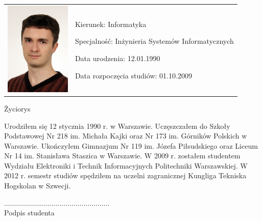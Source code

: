 \documentclass[../thesis.tex]{subfiles}
\begin{document}
\begin{flushleft}
\fontsize{12pt}{30pt}\selectfont

\vspace*{6mm}

\begin{tabular}{l l}
  \begin{minipage}{4cm}
    \includegraphics[height=4.5cm]{face.jpg}
  \end{minipage}
  &
  \begin{minipage}{15cm}
    Kierunek: \hspace{15mm} Informatyka

    Specjalność: \hspace{10mm} Inżynieria Systemów Informatycznych

    Data urodzenia: \hspace{51mm} 12.01.1990

    Data rozpoczęcia studiów: \hspace{33mm} 01.10.2009
  \end{minipage}
\end{tabular} 


\vspace{1.5cm}

\begin{center}
Życiorys
\end{center}
Urodziłem się 12 stycznia 1990 r. w Warszawie. Uczęszczałem do Szkoły Podstawowej Nr 218 im. Michała Kajki oraz Nr 173 im. Górników Polskich w Warszawie. Ukończyłem Gimnazjum Nr 119 im. Józefa Piłsudskiego oraz Liceum Nr 14 im. Stanisława Staszica w Warszawie. W 2009 r. zostałem studentem Wydziału Elektroniki i Technik Informacyjnych Politechniki Warszawskiej. W 2012 r. semestr studiów spędziłem na uczelni zagranicznej Kungliga Tekniska Hogskolan w Szwecji.
\vspace{1cm}

\fontsize{12pt}{14pt}\selectfont
\hspace*{100mm}..................................................... \\
\hspace*{115mm}Podpis studenta
\vspace*{1cm}


\end{flushleft}
\end{document}
